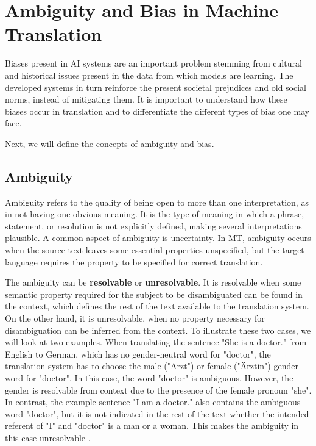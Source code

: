 
\section{Ambiguity and Bias in Machine Translation}
\label{sec:Background:Ambiguity_Bias}
Biases present in AI systems are an important problem stemming from cultural and historical issues present in the data from which models are learning. The developed systems in turn reinforce the present societal prejudices and old social norms, instead of mitigating them. 
It is important to understand how these biases occur in translation and to differentiate the different types of bias one may face.

Next, we will define the concepts of ambiguity and bias.

\subsection{Ambiguity}
\label{sec:Background:Ambiguity}
Ambiguity refers to the quality of being open to more than one interpretation, as in not having one obvious meaning. It is the type of meaning in which a phrase, statement, or resolution is not explicitly defined, making several interpretations plausible. A common aspect of ambiguity is uncertainty. In MT, ambiguity occurs when the source text leaves some essential properties unspecified, but the target language requires the property to be specified for correct translation. 

The ambiguity can be \textbf{resolvable} or \textbf{unresolvable}. It is resolvable when some semantic property required for the subject to be disambiguated can be found in the context, which defines the rest of the text available to the translation system. On the other hand, it is unresolvable, when no property necessary for disambiguation can be inferred from the context. To illustrate these two cases, we will look at two examples. When translating the sentence "She is a doctor." from English to German, which has no gender-neutral word for "doctor", the translation system has to choose the male ("Arzt") or female ("Ärztin") gender word for "doctor". In this case, the word "doctor" is ambiguous. However, the gender is resolvable from context due to the presence of the female pronoun "she". In contrast, the example sentence "I am a doctor." also contains the ambiguous word "doctor", but it is not indicated in the rest of the text whether the intended referent of "I" and "doctor" is a man or a woman. This makes the ambiguity in this case unresolvable \parencite{bias_taxonomy}.

